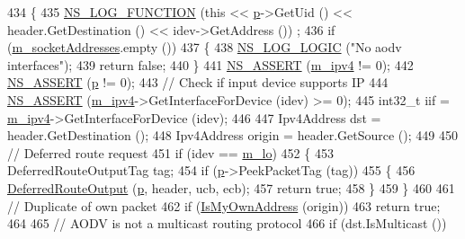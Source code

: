 \begin{DoxyCode}
434 \{
435   \hyperlink{log-macros-disabled_8h_a90b90d5bad1f39cb1b64923ea94c0761}{NS\_LOG\_FUNCTION} (\textcolor{keyword}{this} << \hyperlink{lte__link__budget_8m_ac9de518908a968428863f829398a4e62}{p}->GetUid () << header.GetDestination () << idev->GetAddress ())
      ;
436   \textcolor{keywordflow}{if} (\hyperlink{classns3_1_1aodv_1_1RoutingProtocol_aa3263563cbbd735faafbf17fd4e28a10}{m\_socketAddresses}.empty ())
437     \{
438       \hyperlink{group__logging_ga88acd260151caf2db9c0fc84997f45ce}{NS\_LOG\_LOGIC} (\textcolor{stringliteral}{"No aodv interfaces"});
439       \textcolor{keywordflow}{return} \textcolor{keyword}{false};
440     \}
441   \hyperlink{assert_8h_a6dccdb0de9b252f60088ce281c49d052}{NS\_ASSERT} (\hyperlink{classns3_1_1aodv_1_1RoutingProtocol_aee33006b1f9d8b24d4722037ff3fec98}{m\_ipv4} != 0);
442   \hyperlink{assert_8h_a6dccdb0de9b252f60088ce281c49d052}{NS\_ASSERT} (\hyperlink{lte__link__budget_8m_ac9de518908a968428863f829398a4e62}{p} != 0);
443   \textcolor{comment}{// Check if input device supports IP}
444   \hyperlink{assert_8h_a6dccdb0de9b252f60088ce281c49d052}{NS\_ASSERT} (\hyperlink{classns3_1_1aodv_1_1RoutingProtocol_aee33006b1f9d8b24d4722037ff3fec98}{m\_ipv4}->GetInterfaceForDevice (idev) >= 0);
445   int32\_t iif = \hyperlink{classns3_1_1aodv_1_1RoutingProtocol_aee33006b1f9d8b24d4722037ff3fec98}{m\_ipv4}->GetInterfaceForDevice (idev);
446 
447   Ipv4Address dst = header.GetDestination ();
448   Ipv4Address origin = header.GetSource ();
449 
450   \textcolor{comment}{// Deferred route request}
451   \textcolor{keywordflow}{if} (idev == \hyperlink{classns3_1_1aodv_1_1RoutingProtocol_a55d7e550c45e7a211ba8781f1b5b0015}{m\_lo})
452     \{
453       DeferredRouteOutputTag tag;
454       \textcolor{keywordflow}{if} (\hyperlink{lte__link__budget_8m_ac9de518908a968428863f829398a4e62}{p}->PeekPacketTag (tag))
455         \{
456           \hyperlink{classns3_1_1aodv_1_1RoutingProtocol_a3e53873fd2f4dad41aeba24b9a16ce48}{DeferredRouteOutput} (\hyperlink{lte__link__budget_8m_ac9de518908a968428863f829398a4e62}{p}, header, ucb, ecb);
457           \textcolor{keywordflow}{return} \textcolor{keyword}{true};
458         \}
459     \}
460 
461   \textcolor{comment}{// Duplicate of own packet}
462   \textcolor{keywordflow}{if} (\hyperlink{classns3_1_1aodv_1_1RoutingProtocol_a822621de276958cf1d22fb3be536bb49}{IsMyOwnAddress} (origin))
463     \textcolor{keywordflow}{return} \textcolor{keyword}{true};
464 
465   \textcolor{comment}{// AODV is not a multicast routing protocol}
466   \textcolor{keywordflow}{if} (dst.IsMulticast ())

\end{DoxyCode}
